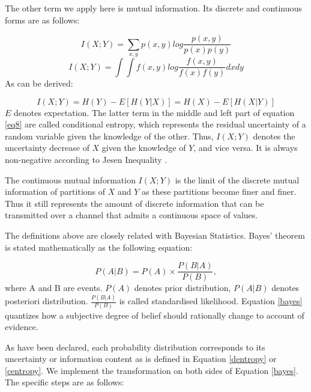\documentclass[review]{elsarticle}
\begin{document}
The other term we apply here is mutual information. Its discrete and continuous forms are as follows:

\begin{equation}
I(X;Y)=\sum_{x,y}p(x,y)log\frac{p(x,y)}{p(x)p(y)}
\end{equation}
\begin{equation}
I(X;Y)=\int \int f(x,y)log\frac{f(x,y)}{f(x)f(y)}dxdy
\end{equation}
As can be derived:

\begin{equation}\label{eq8}
I(X;Y)=H(Y)-E[H(Y|X)]=H(X)-E[H(X|Y)]
\end{equation}
$E$ denotes expectation. The latter term in the middle and left part of equation \ref{eq8} 
are called conditional entropy, which represents the residual uncertainty of a random variable given the knowledge of the other. Thus,
$I(X;Y)$ denotes %
the uncertainty decrease of $X$ given the knowledge of $Y$, and vice versa. It is always non-negative according to  Jesen Inequality \citep{cover2012elements}.

The continuous mutual information $I(X;Y)$ is the limit of the discrete mutual information of partitions of $X$ and $Y$ as these partitions become finer and finer. Thus it  still represents the amount of discrete information that can be transmitted over a channel that admits a continuous space of values.

The definitions above are closely related with Bayesian Statistics. Bayes' theorem is stated mathematically as the following equation:

\begin{equation}
\label{bayes}
P(A|B) = P(A)\times \frac{P(B | A)}{P(B)},
\end{equation}
where A and B are events.
$P(A)$ denotes prior distribution, $P(A|B)$ denotes posteriori distribution. $\frac{P(B | A)}{P(B)}$ is called standardised likelihood. 
Equation \ref{bayes} quantizes how a subjective degree of belief should rationally change to account of evidence. 

As have been declared, each probability distribution corresponds to its uncertainty or information content as is defined in Equation \ref{dentropy}  or  \ref{centropy}. We implement the transformation on both sides of Equation \ref{bayes}. The specific steps are as follows:
\end{document}
